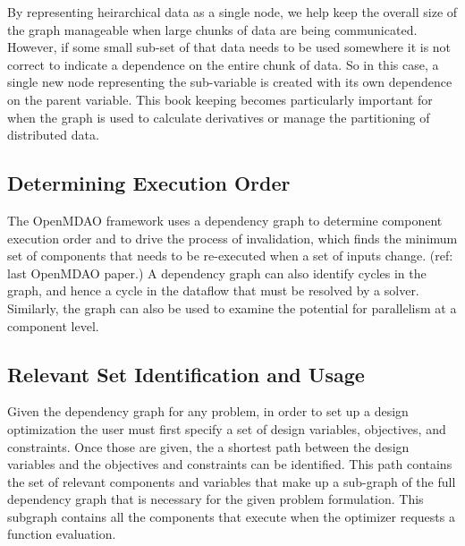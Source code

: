 \documentclass[]{aiaa-tc} %
\begin{document}
    By representing heirarchical data as a single node, we help keep the overall size of the graph manageable 
    when large chunks of data are being communicated. However, if some small sub-set of that data needs to be 
    used somewhere it is not correct to indicate a dependence on the entire chunk of data. So in this case, a 
    single new node representing the sub-variable is created with its own dependence on the parent variable. 
    This book keeping becomes particularly important for when the graph is used to calculate derivatives or 
    manage the partitioning of distributed data. 

    \subsection{Determining Execution Order}
    The OpenMDAO framework uses a dependency graph to determine component execution order and to
    drive the process of invalidation, which finds the minimum set of components that needs to
    be re-executed when a set of inputs change. (ref: last OpenMDAO paper.) A dependency graph
    can also identify cycles in the graph, and hence a cycle in the dataflow that must be resolved
    by a solver. Similarly, the graph can also be used to examine the potential for parallelism at
    a component level.

    \subsection{Relevant Set Identification and Usage}
    Given the dependency graph for any problem, in order to set up a design optimization the user
    must first specify a set of design variables, objectives, and constraints. Once those are given, 
    the a shortest path between the design variables and the objectives and constraints can be identified. 
    This path contains the set of relevant components and variables that make up a sub-graph of the full 
    dependency graph that is necessary for the given problem formulation. This subgraph
    contains all the components that execute when the optimizer requests a function evaluation. 
\end{document}
